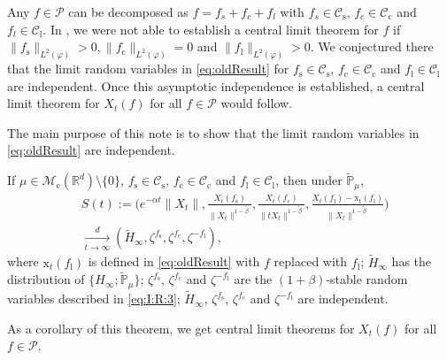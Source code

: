 \documentclass{amse-new}
\numberwithin{equation}{section}
\begin{document}
	Any  $f \in \mathcal P$ can be decomposed as
	$f=f_s + f_c + f_l$
	with $f_s \in \mathcal C_\mathrm s$, $f_c \in \mathcal C_\mathrm c$ and $f_l \in \mathcal C_\mathrm l$.
	In \cite{RenSongSunZhao2019Stable}, we were not able to establish a central limit theorem for $f$ if  $\|f_\mathrm s\|_{L^2(\varphi)}> 0, \|f_\mathrm c\|_{L^2(\varphi)} = 0$ and $\|f_\mathrm l\|_{L^2(\varphi)}> 0$.
	We conjectured there that the limit random variables in \eqref{eq:oldResult} for $f_\mathrm s\in \mathcal C_\mathrm s$, $f_\mathrm c\in \mathcal C_\mathrm c$ and $f_\mathrm l\in \mathcal C_\mathrm l$ are independent.
	Once this asymptotic independence is established, a central limit theorem  for $ X_t(f)$ for all $f\in  \mathcal P$ would follow.

	The main purpose of this note is to show that the limit  random variables in \eqref{eq:oldResult} are independent.

\begin{theorem}
\label{thm:M}
	If $\mu\in \mathcal M_\mathrm c(\mathbb R^d)\setminus \{0\}$, $f_\mathrm s\in \mathcal C_\mathrm s$, $f_\mathrm c \in \mathcal C_\mathrm c$ and $f_\mathrm l \in \mathcal C_\mathrm l$, then under $\mathbb {\widetilde P}_\mu$,
\begin{align} \label{eq:M.1}
	&S(t):=
	\Bigg(e^{-\alpha t}\|X_t\|, \frac{X_t(f_\mathrm s)}{\|X_t\|^{1-\tilde \beta}},\frac{X_t(f_\mathrm c)}{\|tX_t\|^{1-\tilde \beta}}, \frac{ X_t(f_\mathrm l) - \mathrm x_t(f_\mathrm l)}{\|X_t\|^{1-\tilde \beta}}
	\Bigg)
	\\&\xrightarrow[t\rightarrow \infty]{d}(\widetilde H_\infty,\zeta^{f_\mathrm s},\zeta^{f_\mathrm c},\zeta^{-f_\mathrm l}),
\end{align}
	where $\mathrm x_t(f_\mathrm l)$ is defined in
	\eqref{eq:oldResult}
	with $f$ replaced with $f_\mathrm l$;
	$\widetilde H_\infty$ has the distribution of $\{H_{\infty}; \widetilde {\mathbb P}_\mu\}$;
	$\zeta^{f_\mathrm s}$, $\zeta^{f_\mathrm c}$ and $\zeta^{-f_\mathrm l}$ are the $(1+\beta)$-stable random variables described in \eqref{eq:I:R:3};
	$\widetilde H_\infty$,  $\zeta^{f_\mathrm s}$, $\zeta^{f_\mathrm c}$ and $\zeta^{-f_\mathrm l}$ are independent.
\end{theorem}

	As a corollary of this theorem, we get  central limit theorems for $X_t(f)$ for all $f\in \mathcal P$.
\end{document}
